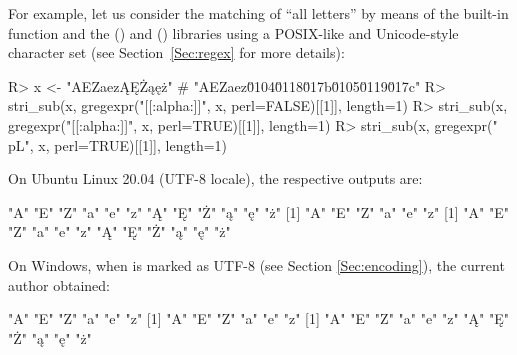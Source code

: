 \documentclass[nojss]{jss}\usepackage[]{graphicx}\usepackage[]{color}
\begin{document}
%




For example, let us consider the matching
of ``all letters'' by means of the built-in  function
and the  ()
and  () libraries
using a POSIX-like and Unicode-style character set
(see Section~\ref{Sec:regex} for more details):

\begin{Schunk}
\begin{Sinput}
R> x <- "AEZaezĄĘŻąęż"  # "AEZaez\u0104\u0118\u017b\u0105\u0119\u017c"
R> stri_sub(x, gregexpr("[[:alpha:]]", x, perl=FALSE)[[1]], length=1)
R> stri_sub(x, gregexpr("[[:alpha:]]", x, perl=TRUE)[[1]],  length=1)
R> stri_sub(x, gregexpr("\\p{L}", x, perl=TRUE)[[1]],       length=1)
\end{Sinput}
\end{Schunk}

On Ubuntu Linux 20.04 (UTF-8 locale), the respective outputs are:

\begin{Schunk}
\begin{Soutput}
[1] "A" "E" "Z" "a" "e" "z" "Ą" "Ę" "Ż" "ą" "ę" "ż"
[1] "A" "E" "Z" "a" "e" "z"
[1] "A" "E" "Z" "a" "e" "z" "Ą" "Ę" "Ż" "ą" "ę" "ż"
\end{Soutput}
\end{Schunk}

On Windows, when  is marked as UTF-8
(see Section \ref{Sec:encoding}), the current author obtained:

\begin{Schunk}
\begin{Soutput}
[1] "A" "E" "Z" "a" "e" "z"
[1] "A" "E" "Z" "a" "e" "z"
[1] "A" "E" "Z" "a" "e" "z" "Ą" "Ę" "Ż" "ą" "ę" "ż"
\end{Soutput}
\end{Schunk}
\end{document}
